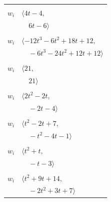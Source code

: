\documentclass[11pt]{article}
\begin{document}
\begin{longtable}{@{}ll@{}}
\addlinespace[2pt]
\multicolumn{2}{@{}p{0.97\textwidth}@{}}{$i=6$, $D_i=1$, $\rho_{ij}$: $12{:}2, \allowbreak 13{:}1, \allowbreak 25{:}1, \allowbreak 32{:}1$}\\
$w_i$ & $\langle 4t-4,$\\
 & $\quad 6t-6\rangle$\\
\addlinespace[2pt]
\multicolumn{2}{@{}p{0.97\textwidth}@{}}{$i=7$, $D_i=1$, $\rho_{ij}$: $9{:}2, \allowbreak 10{:}1, \allowbreak 13{:}2, \allowbreak 16{:}2, \allowbreak 25{:}1, \allowbreak 31{:}2, \allowbreak 32{:}2, \allowbreak 33{:}1$}\\
$w_i$ & $\langle -12t^{3}-6t^{2}+18t+12,$\\
 & $\quad -6t^{3}-24t^{2}+12t+12\rangle$\\
\addlinespace[2pt]
\multicolumn{2}{@{}p{0.97\textwidth}@{}}{$i=8$, $D_i=1$, $\rho_{ij}$: $10{:}2, \allowbreak 28{:}2, \allowbreak 32{:}2, \allowbreak 35{:}2$}\\
$w_i$ & $\langle 21,$\\
 & $\quad 21\rangle$\\
\addlinespace[2pt]
\multicolumn{2}{@{}p{0.97\textwidth}@{}}{$i=9$, $D_i=1$, $\rho_{ij}$: $7{:}1, \allowbreak 23{:}1, \allowbreak 24{:}2, \allowbreak 27{:}1$}\\
$w_i$ & $\langle 2t^{2}-2t,$\\
 & $\quad -2t-4\rangle$\\
\addlinespace[2pt]
\multicolumn{2}{@{}p{0.97\textwidth}@{}}{$i=10$, $D_i=1$, $\rho_{ij}$: $3{:}2, \allowbreak 7{:}2, \allowbreak 8{:}1, \allowbreak 22{:}1, \allowbreak 26{:}1, \allowbreak 27{:}2, \allowbreak 29{:}1, \allowbreak 31{:}1$}\\
$w_i$ & $\langle t^{2}-2t+7,$\\
 & $\quad -t^{2}-4t-1\rangle$\\
\addlinespace[2pt]
\multicolumn{2}{@{}p{0.97\textwidth}@{}}{$i=11$, $D_i=1$, $\rho_{ij}$: $2{:}1, \allowbreak 18{:}2, \allowbreak 23{:}1, \allowbreak 30{:}2, \allowbreak 33{:}1$}\\
$w_i$ & $\langle t^{2}+t,$\\
 & $\quad -t-3\rangle$\\
\addlinespace[2pt]
\multicolumn{2}{@{}p{0.97\textwidth}@{}}{$i=12$, $D_i=1$, $\rho_{ij}$: $2{:}2, \allowbreak 4{:}2, \allowbreak 6{:}1, \allowbreak 17{:}1, \allowbreak 22{:}1, \allowbreak 23{:}1, \allowbreak 32{:}1, \allowbreak 34{:}1$}\\
$w_i$ & $\langle t^{2}+9t+14,$\\
 & $\quad -2t^{2}+3t+7\rangle$\\

\end{longtable}
\end{document}
